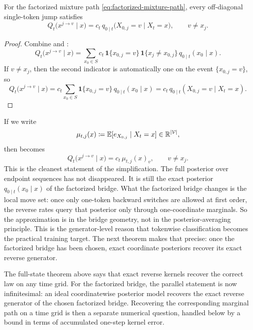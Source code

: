 \documentclass[11pt]{article}
\begin{document}
\begin{theorem}
\label{thm:factorized-rates}
For the factorized mixture path \eqref{eq:factorized-mixture-path}, every off-diagonal single-token jump satisfies
\begin{equation}
  Q_t\!\bigl(x^{j\to v}\mid x\bigr)
  =
  c_t\,q_{0\mid t}\!\bigl(X_{0,j}=v\mid X_t=x\bigr),
  \qquad v\neq x_j.
  \label{eq:factorized-rate}
\end{equation}
\end{theorem}
\begin{proof}
Combine  and :
\[
  Q_t\!\bigl(x^{j\to v}\mid x\bigr)
  =
  \sum_{x_0\in S}
  c_t\,\mathbf{1}\{x_{0,j}=v\}\,\mathbf{1}\{x_j\neq x_{0,j}\}\,
  q_{0\mid t}(x_0\mid x).
\]
If \(v\neq x_j\), then the second indicator is automatically one on the event \(\{x_{0,j}=v\}\), so
\[
  Q_t\!\bigl(x^{j\to v}\mid x\bigr)
  =
  c_t\sum_{x_0\in S}\mathbf{1}\{x_{0,j}=v\}\,q_{0\mid t}(x_0\mid x)
  =
  c_t\,q_{0\mid t}(X_{0,j}=v\mid X_t=x).
\]
\end{proof}

If we write
\[
  \mu_{t,j}(x)\coloneqq \mathbb{E}[e_{X_{0,j}}\mid X_t=x]\in\mathbb{R}^{|\mathcal{V}|},
\]
then  becomes
\begin{equation}
  Q_t\!\bigl(x^{j\to v}\mid x\bigr)
  =
  c_t\,\mu_{t,j}(x)_v,
  \qquad v\neq x_j.
  \label{eq:factorized-rate-onehot}
\end{equation}
This is the cleanest statement of the simplification.
The full posterior over endpoint sequences has not disappeared.
It is still the exact posterior \(q_{0\mid t}(x_0\mid x)\) of the factorized bridge.
What the factorized bridge changes is the local move set: once only one-token backward switches are allowed at first order, the reverse rates query that posterior only through one-coordinate marginals.
So the approximation is in the bridge geometry, not in the posterior-averaging principle.
This is the generator-level reason that tokenwise classification becomes the practical training target.
The next theorem makes that precise: once the factorized bridge has been chosen, exact coordinate posteriors recover its exact reverse generator.

The full-state theorem above says that exact reverse kernels recover the correct law on any time grid.
For the factorized bridge, the parallel statement is now infinitesimal:
an ideal coordinatewise posterior model recovers the exact reverse generator of the chosen factorized bridge.
Recovering the corresponding marginal path on a time grid is then a separate numerical question, handled below by a bound in terms of accumulated one-step kernel error.
\end{document}
